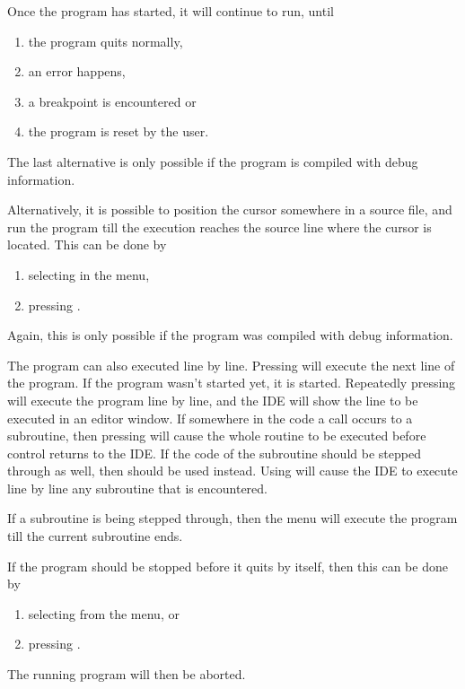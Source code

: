
Once the program has started, it will continue to run, until
\begin{enumerate}
\item the program quits normally,
\item an error happens,
\item a breakpoint is encountered or
\item the program is reset by the user.
\end{enumerate}
The last alternative is only possible if the program is compiled
with debug information.

Alternatively, it is possible to position the cursor somewhere in a
source file, and run the program till the execution reaches the
source line where the cursor is located. This can be done by
\begin{enumerate}
\item selecting  in the menu,
\item pressing .
\end{enumerate}
Again, this is only possible if the program was compiled with debug
information.

The program can also executed line by line. Pressing  will
execute the next line of the program. If the program wasn't started
yet, it is started. Repeatedly pressing  will execute the program
line by line, and the IDE will show the line to be executed
in an editor window. If somewhere in the code a call occurs to a subroutine,
then pressing  will cause the whole routine to be executed before
control returns to the IDE. If the code of the subroutine should be stepped
through as well, then  should be used instead. Using  will
cause the IDE to execute line by line any subroutine that is encountered.

If a subroutine is being stepped through, then the  menu
will execute the program till the current subroutine ends.

If the program should be stopped before it quits by itself, then this can be
done by
\begin{enumerate}
\item selecting  from the menu, or
\item pressing .
\end{enumerate}
The running program will then be aborted.

